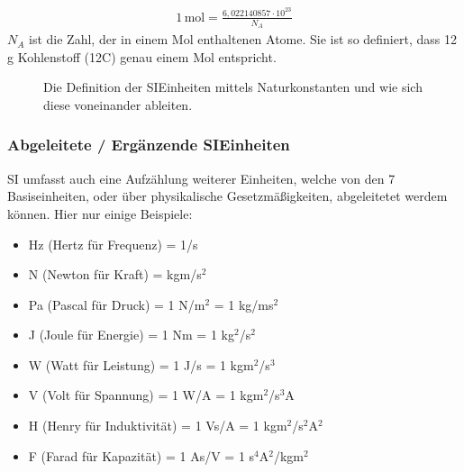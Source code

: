 \documentclass[letterpaper,10pt,english]{jupyterBook}
\let\sphinxpxdimen\pdfpxdimen\else\newdimen\sphinxpxdimen
\begin{document}
\begin{equation*}
\begin{split} 1\,\mathrm{mol} = \frac{6,022 140 857 \cdot 10^23}{N_A}\end{split}
\end{equation*}
\sphinxAtStartPar
\(N_A\) ist die Zahl, der in einem Mol enthaltenen Atome. Sie ist so definiert, dass 12 g Kohlenstoff (12C) genau einem Mol entspricht.

\begin{figure}[htbp]
\centering
\capstart

\noindent\sphinxincludegraphics[width=600\sphinxpxdimen]{{SI-konst}.jpg}
\caption{Die Definition der SI\sphinxhyphen{}Einheiten mittels Naturkonstanten und wie sich diese voneinander ableiten.}\label{\detokenize{content/1_Messen_Einheit:si-konst}}\end{figure}


\subsubsection{Abgeleitete / Ergänzende SI\sphinxhyphen{}Einheiten}
\label{\detokenize{content/1_Messen_Einheit:abgeleitete-erganzende-si-einheiten}}
\sphinxAtStartPar


\sphinxAtStartPar
SI umfasst auch eine Aufzählung weiterer Einheiten, welche von den 7 Basiseinheiten, oder über physikalische Gesetzmäßigkeiten, abgeleitetet werdem können. Hier nur einige Beispiele:
\begin{itemize}
\item {} 
 Hz (Hertz für Frequenz) = 1/s

\item {} 
 N (Newton für Kraft) = kgm/s\(^2\)

\item {} 
 Pa (Pascal für Druck) = 1 N/m\(^2\) = 1 kg/ms\(^2\)

\item {} 
 J (Joule für Energie) = 1 Nm = 1 kg\(^2\)/s\(^2\)

\item {} 
 W (Watt für Leistung) = 1 J/s = 1 kgm\(^2\)/s\(^3\)

\item {} 
 V (Volt für Spannung) = 1 W/A = 1 kgm\(^2\)/s\(^3\)A

\item {} 
 H (Henry für Induktivität) = 1 Vs/A = 1 kgm\(^2\)/s\(^2\)A\(^2\)

\item {} 
 F (Farad für Kapazität) = 1 As/V = 1 s\(^4\)A\(^2\)/kgm\(^2\)

\end{itemize}
\end{document}
